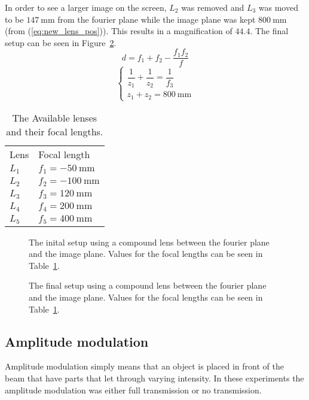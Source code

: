 \documentclass[12pt,a4paper]{article}
\begin{document}
In order to see a larger image on the screen, $L_2$ was removed and $L_3$ was moved to be $\SI{147}{\milli\metre}$ from the fourier plane while the image plane was kept $\SI{800}{\milli\metre}$ (from (\ref{eq:new_lens_pos})). This results in a magnification of $44.4$. The final setup can be seen in Figure~\ref{fig:setup_final}.
\begin{equation}
  \label{eq:clens_sep}
  d=f_1+f_2-\frac{f_1f_2}{f}
\end{equation}
\begin{equation}
  \label{eq:new_lens_pos}
  \begin{cases}
    \dfrac{1}{z_1}+\dfrac{1}{z_2}=\dfrac{1}{f_3} \\
    z_1+z_2=\SI{800}{\milli\metre}
  \end{cases}
\end{equation}
\begin{table}
  \centering
  \begin{tabular}{|l|l|}\hline
    Lens & Focal length \\
    $L_1$ & $f_1=\SI{-50}{\milli\metre}$ \\
    $L_2$ & $f_2=\SI{-100}{\milli\metre}$ \\
    $L_3$ & $f_3=\SI{120}{\milli\metre}$ \\
    $L_4$ & $f_4=\SI{200}{\milli\metre}$ \\
    $L_5$ & $f_5=\SI{400}{\milli\metre}$ \\ \hline
  \end{tabular}
  \caption{The Available lenses and their focal lengths.}
  \label{tab:lenses}
\end{table}
\begin{figure}[h]
  \centering
  \noindent\makebox[\textwidth]{\scalebox{0.70}{}}
  \caption{The inital setup using a compound lens between the fourier plane and the image plane. Values for the focal lengths can be seen in Table~\ref{tab:lenses}.}
  \label{fig:setup0}
\end{figure}
\begin{figure}[h]
  \centering
  \noindent\makebox[\textwidth]{\scalebox{0.70}{}}
  \caption{The final setup using a compound lens between the fourier plane and the image plane. Values for the focal lengths can be seen in Table~\ref{tab:lenses}.}
  \label{fig:setup_final}
\end{figure}

\subsection{Amplitude modulation}\label{sec:ampmod}
Amplitude modulation simply means that an object is placed in front of the beam that have parts that let through varying intensity. In these experiments the amplitude modulation was either full transmission or no transmission.
\end{document}
